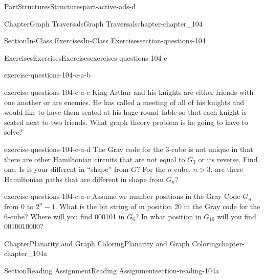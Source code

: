 \documentclass[oneside,10pt,]{book}
\numberwithin{equation}{section}
\newcommand{\gt}{>}
\begin{document}
\begin{partptx}{Part}{Structures}{}{Structures}{}{}{part-active-ads-d}
\begin{chapterptx}{Chapter}{Graph Traversals}{}{Graph Traversals}{}{}{chapter-chapter_104}
\begin{sectionptx}{Section}{In-Class Exercises}{}{In-Class Exercises}{}{}{section-questions-104}
\begin{exercises-subsection-numberless}{Exercises}{Exercises}{}{Exercises}{}{}{exercises-questions-104-c}
\begin{exercisegroup}
\begin{divisionexerciseeg}{2}{}{}{exercise-questions-104-c-a-b}
\end{divisionexerciseeg}%
\begin{divisionexerciseeg}{3}{}{}{exercise-questions-104-c-a-c}%
King Arthur and his knights are either friends with one another or are enemies.  He has called a meeting of all of his knights and would like to have them seated at his huge round table so that each knight is seated next to two friends. What graph theory problem is he going to have to solve?%
\end{divisionexerciseeg}%
\begin{divisionexerciseeg}{4}{}{}{exercise-questions-104-c-a-d}%
The Gray code for the 3-cube is not unique in that there are other Hamiltonian circuits that are not equal to \(G_3\) or its reverse.  Find one.   Is it your different in ``shape'' from \(G\)?   For the \(n\)-cube, \(n \gt 3\), are there Hamiltonian paths that are different in shape from \(G_n\)?%
\end{divisionexerciseeg}%
\begin{divisionexerciseeg}{5}{}{}{exercise-questions-104-c-a-e}%
Assume we number positions in the Gray Code \(G_n\) from 0 to \(2^n-1\).  What is the bit string of in position 20 in the Gray code for the 6-cube? Where will you find 000101 in \(G_6\)?	 In what position in \(G_{10}\) will you find 0010010000?%
\end{divisionexerciseeg}%
\end{exercisegroup}
\par\medskip\noindent
\end{exercises-subsection-numberless}
\end{sectionptx}
\end{chapterptx}
%
\typeout{************************************************}
\typeout{************************************************}
%
\begin{chapterptx}{Chapter}{Planarity and Graph Coloring}{}{Planarity and Graph Coloring}{}{}{chapter-chapter_104a}
\renewcommand*{\chaptername}{Chapter}
%
%
%
%
%
\typeout{************************************************}
\typeout{************************************************}
%
\begin{sectionptx}{Section}{Reading Assignment}{}{Reading Assignment}{}{}{section-reading-104a}

\end{sectionptx}
\end{chapterptx}
\end{partptx}
\end{document}
